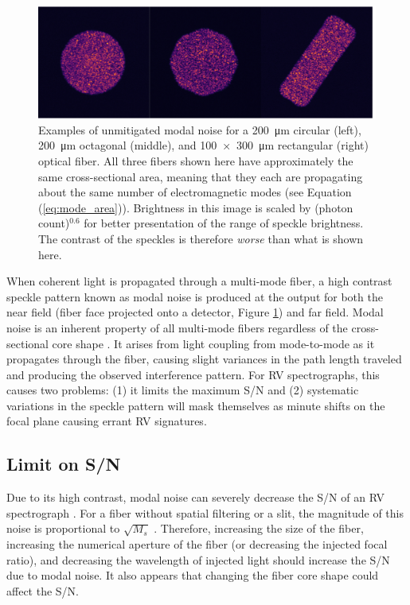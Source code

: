 \begin{figure}
\centering
	\includegraphics[width=\columnwidth]{figures-2/fiber_example.pdf}
	\caption[Fiber faces affected by modal noise]{Examples of unmitigated modal noise for a \SI{200}{\micro\meter} circular (left), \SI{200}{\micro\meter} octagonal (middle), and \SI{100x300}{\micro\meter} rectangular (right) optical fiber. All three fibers shown here have approximately the same cross-sectional area, meaning that they each are propagating about the same number of electromagnetic modes (see Equation (\ref{eq:mode_area})). Brightness in this image is scaled by (photon count)$^{0.6}$ for better presentation of the range of speckle brightness. The contrast of the speckles is therefore \textit{worse} than what is shown here.}
\label{fig:fiber_example}
\end{figure}

When coherent light is propagated through a multi-mode fiber, a high contrast speckle pattern known as modal noise is produced at the output for both the near field (fiber face projected onto a detector, Figure \ref{fig:fiber_example}) and far field. Modal noise is an inherent property of all multi-mode fibers regardless of the cross-sectional core shape \citep{sablowski_comparing_2016}. It arises from light coupling from mode-to-mode as it propagates through the fiber, causing slight variances in the path length traveled and producing the observed interference pattern. For RV spectrographs, this causes two problems: (1) it limits the maximum S/N and (2) systematic variations in the speckle pattern will mask themselves as minute shifts on the focal plane causing errant RV signatures.

\subsection{Limit on S/N}

Due to its high contrast, modal noise can severely decrease the S/N of an RV spectrograph \citep{epworth_phenomenon_1978, baudrand_modal_2001, lemke_modal_2011, iuzzolino_preliminary_2014}. For a fiber without spatial filtering or a slit, the magnitude of this noise is proportional to $\sqrt{M_s}$ \citep{goodman_statistics_1981}. Therefore, increasing the size of the fiber, increasing the numerical aperture of the fiber (or decreasing the injected focal ratio), and decreasing the wavelength of injected light should increase the S/N due to modal noise. It also appears that changing the fiber core shape could affect the S/N.

